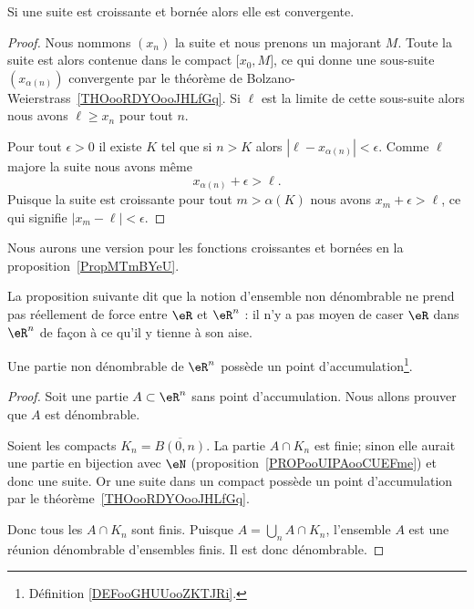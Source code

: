\begin{corollary}   \label{CorFHbMqGGyi}
	Si une suite est croissante et bornée alors elle est convergente.
\end{corollary}

\begin{proof}
	Nous nommons \( (x_n)\) la suite et nous prenons un majorant \( M\). Toute la suite est alors contenue dans le compact \( \mathopen[ x_0 , M \mathclose]\), ce qui donne une sous-suite \( (x_{\alpha(n)})\) convergente par le théorème de Bolzano-Weierstrass~\ref{THOooRDYOooJHLfGq}. Si \( \ell\) est la limite de cette sous-suite alors nous avons \( \ell\geq x_n\) pour tout \( n\).

	Pour tout \( \epsilon>0\) il existe \( K\) tel que si \( n>K\) alors \( | \ell-x_{\alpha(n)} |<\epsilon\). Comme \( \ell\) majore la suite nous avons même
	\begin{equation}
		x_{\alpha(n)}+\epsilon>\ell.
	\end{equation}
	Puisque la suite est croissante pour tout \( m>\alpha(K)\) nous avons \( x_m+\epsilon>\ell\), ce qui signifie \( | x_m-\ell |<\epsilon\).
\end{proof}
Nous aurons une version pour les fonctions croissantes et bornées en la proposition~\ref{PropMTmBYeU}.

La proposition suivante dit que la notion d'ensemble non dénombrable ne prend pas réellement de force entre \( \eR\) et \( \eR^n\) : il n'y a pas moyen de caser \( \eR\) dans \( \eR^n\) de façon à ce qu'il y tienne à son aise.

\begin{proposition}
	Une partie non dénombrable de \( \eR^n\) possède un point d'accumulation\footnote{Définition \ref{DEFooGHUUooZKTJRi}.}.
\end{proposition}

\begin{proof}
	Soit une partie \( A\subset \eR^n\) sans point d'accumulation. Nous allons prouver que \( A\) est dénombrable.

	Soient les compacts \( K_n=\overline{ B(0,n) }\). La partie \( A\cap K_n\) est finie; sinon elle aurait une partie en bijection avec \( \eN\) (proposition~\ref{PROPooUIPAooCUEFme}) et donc une suite. Or une suite dans un compact possède un point d'accumulation par le théorème~\ref{THOooRDYOooJHLfGq}.

	Donc tous les \( A\cap K_n\) sont finis. Puisque \( A=\bigcup_nA\cap K_n\), l'ensemble \( A\) est une réunion dénombrable d'ensembles finis. Il est donc dénombrable.
\end{proof}

